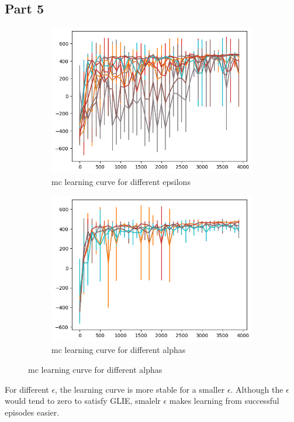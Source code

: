\documentclass{article}
\begin{document}
    \subsection{Part 5}\label{subsec:question-2-5}
    \begin{figure}[h]
        \begin{subfigure} {0.5\textwidth}
            \includegraphics[width=0.9\linewidth]{images/mc_learning_curve_epsilons}
            \caption{mc learning curve for different epsilons}\label{fig:mc_learning_curve_epsilons}
        \end{subfigure}
        \begin{subfigure} {0.5\textwidth}
            \includegraphics[width=0.9\linewidth]{images/mc_learning_curve_alphas}
            \caption{mc learning curve for different alphas}\label{fig:mc_learning_curve_alphas}
        \end{subfigure}
    \end{figure}
    For different $\epsilon$, the learning curve is more stable for a smaller $\epsilon$.
    Although the $\epsilon$ would tend to zero to satisfy GLIE, smalelr $\epsilon$ makes learning from successful episodes easier.
\end{document}
